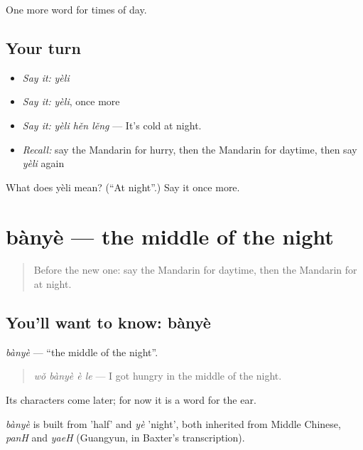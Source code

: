 \begin{grammarlens}[title={What you've built}]
One more word for times of day.
\end{grammarlens}

\subsection*{Your turn}
\begin{itemize}
\raggedright
  \item \emph{Say it:} \emph{yèli}
  \item \emph{Say it:} \emph{yèli}, once more
  \item \emph{Say it:} \emph{yèli hěn lěng} — It's cold at night.
  \item \emph{Recall:} say the Mandarin for hurry, then the Mandarin for daytime, then say \emph{yèli} again
\end{itemize}

\begin{tcolorbox}[breakable,colback=teal!4,colframe=teal!35!black,title={Before you move on}]
What does yèli mean? (\textquotedblleft{}At night\textquotedblright{}.) Say it once more.
\end{tcolorbox}
\section[bànyè]{bànyè — the middle of the night}

\label{lesson:ZH-C146-banye}



\begin{quote}
Before the new one: say the Mandarin for daytime, then the Mandarin for at night.
\end{quote}

\subsection*{You'll want to know: bànyè}
\emph{bànyè} — \textquotedblleft{}the middle of the night\textquotedblright{}.

\begin{quote}
\emph{wǒ bànyè è le} — I got hungry in the middle of the night.
\end{quote}

Its characters come later; for now it is a word for the ear.

\begin{cousinweb}
\emph{bànyè} is built from  'half' and \emph{yè} 'night', both inherited from Middle Chinese, \emph{panH} and \emph{yaeH} (Guangyun, in Baxter's transcription).
\end{cousinweb}

